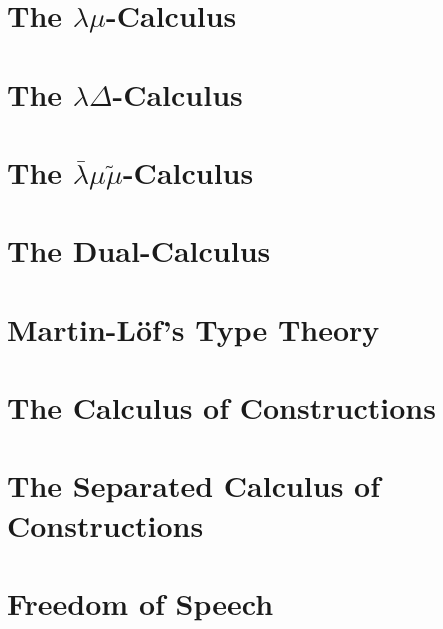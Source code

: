 \documentclass[phd,appendix,dedicationpage,ackpage,epigraphpage]{uithesis}
\newcommand{\LBMMT}[0]{\bar{\lambda}\mu\tilde\mu}
\begin{document}

\newpage
\section{The $\lambda\mu$-Calculus}
\label{sec:lamu_all}
\Lamuall{}

\newpage
\section{The $\lambda\Delta$-Calculus}
\label{sec:lamd_all}
\Lamdall{}

\newpage
\section{The $\LBMMT$-Calculus}
\label{sec:lbmmt_all}
\LBMMTall{}

\newpage
\section{The Dual-Calculus}
\label{sec:dc_all}
\DCall{}

\newpage
\section{Martin-L\"of's Type Theory}
\label{sec:tt_all}
\TTall{}

\newpage
\section{The Calculus of Constructions}
\label{sec:coc_all}
\CoCall{}

\newpage
\section{The Separated Calculus of Constructions}
\label{sec:coc_sep_all}
\CoCSall{}

\newpage
\section{Freedom of Speech}
\label{sec:freedom_of_speech_all}
\FSall{}
\end{document}
